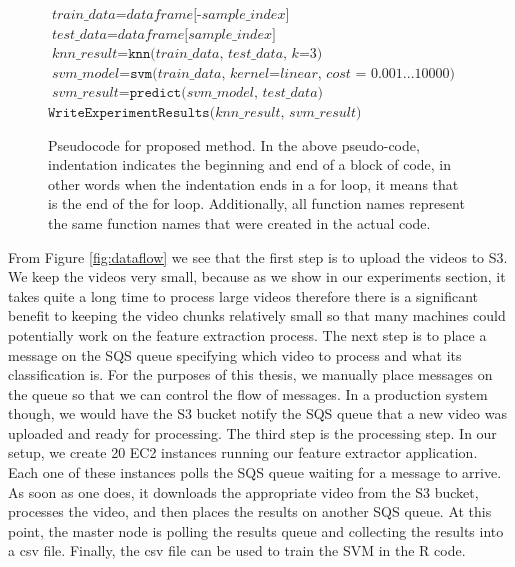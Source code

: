 \begin{figure}[h]
\begin{algorithmic}[1]
   
    \State $\textit{train\_data} = \textit{dataframe[-sample\_index]}$
    \State $\textit{test\_data} = \textit{dataframe[sample\_index]}$
    \State $\textit{knn\_result} = \texttt{knn(}\textit{train\_data, test\_data, k=3} \texttt{)}$
    \State $\textit{svm\_model} = \texttt{svm(}\textit{train\_data, kernel=linear, cost = 0.001...10000} \textit{)}$
    \State $\textit{svm\_result} = \texttt{predict(} \textit{svm\_model, test\_data} \texttt{)}$
  \EndFor
  \State $\texttt{WriteExperimentResults(} \textit{knn\_result, svm\_result} \texttt{)}$

\end{algorithmic}

\caption{Pseudocode for proposed method. In the above pseudo-code, indentation
indicates the beginning and end of a block of code, in other words when the
indentation ends in a for loop, it means that is the end of the for loop. Additionally,
all function names represent the same function names that were created in the actual
code.}
\label{alg:vida_pseudo_code}

\end{figure}

\FloatBarrier

From Figure \ref{fig:dataflow} we see that the first step is to upload
the videos to S3. We keep the videos very small, because as we show in our experiments
section, it takes quite a long time to process large videos therefore there is a
significant benefit to keeping the video chunks relatively small so that many
machines could potentially work on the feature extraction process. The next step
is to place a message on the SQS queue specifying which video to process and
what its classification is. For the purposes of this thesis, we manually place
messages on the queue so that we can control the flow of messages. In
a production system though, we would have the S3 bucket notify the SQS queue that
a new video was uploaded and ready for processing. The third step is the processing
step. In our setup, we create 20 EC2 instances running our feature extractor application.
Each one of these instances polls the SQS queue waiting for a message to arrive.
As soon as one does, it downloads the appropriate video from the S3 bucket,
processes the video, and then places the results on another SQS queue. At this
point, the master node is polling the results queue and collecting the results
into a csv file. Finally, the csv file can be used to train the SVM in the R
code.

